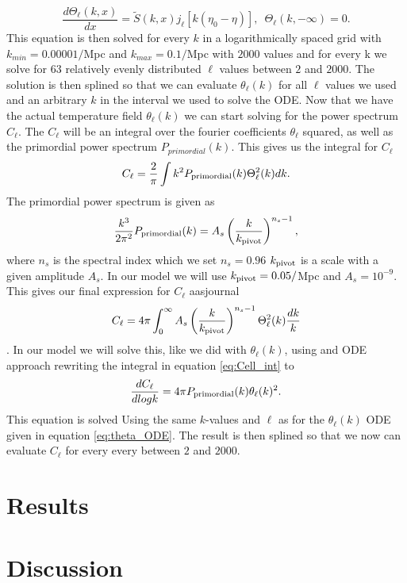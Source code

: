 \documentclass[onecolumn]{aastex62}
\begin{document}
\begin{equation}\label{eq:theta_ODE}
    \frac{d\Theta_\ell(k, x)}{dx} = \tilde{S}(k,x) j_\ell[k(\eta_0-\eta)],\,\,\, \Theta_\ell(k, -\infty) = 0.
\end{equation}
This equation is then solved for every $k$ in a logarithmically spaced grid with $k_{min}=0.00001/$Mpc and $k_{max}=0.1/$Mpc with $2000$ values and for every k we solve for $63$ relatively evenly distributed $\ell$ values between $2$ and $2000$. The solution is then splined so that we can evaluate $\theta_\ell(k)$ for all $\ell$ values we used and an arbitrary $k$ in the interval we used to solve the ODE. Now that we have the actual temperature field $\theta_\ell(k)$ we can start solving for the power spectrum $C_\ell$. The $C_\ell$ will be an integral over the fourier coefficients $\theta_\ell$ squared, as well as the primordial power spectrum $P_{primordial}(k)$. This gives us the integral for $C_\ell$
\begin{equation}
    C_\ell = \frac{2}{\pi}\int k^2P_{\rm primordial}(k) \Theta_\ell^2(k)dk.
\end{equation}
The primordial power spectrum is given as
\begin{equation}
    \frac{k^3}{2\pi^2} P_{\rm primordial}(k) = A_s \left(\frac{k}{k_{\rm pivot}}\right)^{n_s-1},
\end{equation}
where $n_s$ is the spectral index which we set $n_s=0.96$ $k_{\rm pivot}$ is a scale with a given amplitude $A_s$. In our model we will use $k_{\rm pivot} = 0.05/$Mpc and $A_s=10^{-9}$. This gives our final expression for $C_\ell$ aasjournal
\begin{equation}\label{eq:Cell_int}
    C_\ell = 4\pi \int_0^{\infty} A_s \left(\frac{k}{k_{\rm pivot}}\right)^{n_s-1} \Theta_{\ell}^2(k) \frac{dk}{k}
\end{equation}
\cite{WintherIV:2020}. In our model we will solve this, like we did with $\theta_{\ell}(k)$, using and ODE approach rewriting the integral in equation \ref{eq:Cell_int} to 
\begin{equation}\label{eq:Cell_ODE}
    \frac{dC_{\ell}}{dlogk} = 4 \pi P_{\rm primordial}(k) \theta_{\ell}(k)^2.
\end{equation}
This equation is solved Using the same $k$-values and $\ell$ as for the $\theta_{\ell}(k)$ ODE given in equation \ref{eq:theta_ODE}. The result is then splined so that we now can evaluate $C_{\ell}$ for every every between $2$ and $2000$.
\section{Results}
\label{sec:results}


\section{Discussion}\label{sec:discussion}



\end{document}
